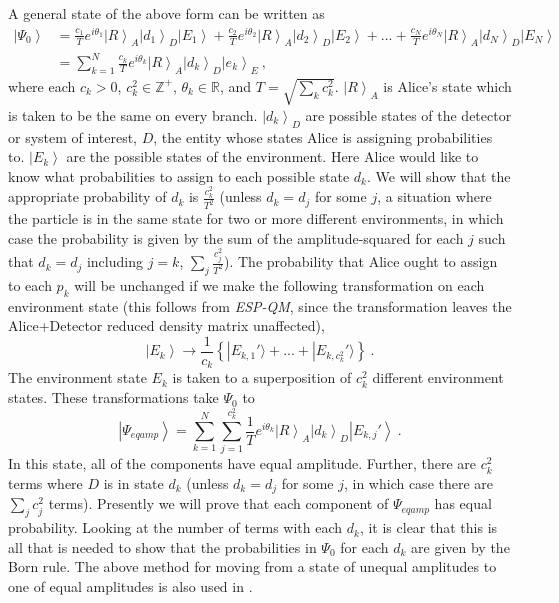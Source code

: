 \documentclass[onecolumn,secnumarabic,amsmath,amssymb,balancelastpage,nofootinbib]{article}
\newcommand{\ket}[1]{\ensuremath{\left|#1\right\rangle}}
\begin{document}
A general state of the above form can be written as
\begin{align}
\ket{\Psi_0}&= \frac{c_1}{T}e^{i\theta_1}\ket{R}_A\ket{d_1}_D\ket{E_1}+\frac{c_2}{T}e^{i\theta_2}\ket{R}_A\ket{d_2}_D\ket{E_2}+...+\frac{c_N}{T}e^{i\theta_N}\ket{R}_A\ket{d_N}_D\ket{E_N}
\nonumber
\\
&= \sum_{k=1}^N{\frac{c_k}{T}e^{i\theta_k}\ket{R}_A\ket{d_k}_D\ket{e_k}_E}\ ,
\label{}
\end{align}
where each $c_k>0$, $c_k^2\in\mathbb{Z}^+$, $\theta_k\in\mathbb{R}$, and $T=\sqrt{\sum_k{c_k^2}}$.  $\ket{R}_A$ is Alice's state which is taken to be the same on every branch.  $\ket{d_k}_D$ are possible states of the detector or system of interest, $D$, the entity whose states Alice is assigning probabilities to.  $\ket{E_k}$ are the possible states of the environment.  Here Alice would like to know what probabilities to assign to each possible state $d_k$.  We will show that the appropriate probability of $d_k$ is $\frac{c_k^2}{T^2}$ (unless $d_k=d_j$ for some $j$, a situation where the particle is in the same state for two or more different environments, in which case the probability is given by the sum of the amplitude-squared for each $j$ such that $d_k=d_j$ including $j=k$, $\sum_j\frac{c_j^2}{T^2}$).  The probability that Alice ought to assign to each $p_k$ will be unchanged if we make the following transformation on each environment state (this follows from \emph{ESP-QM}, since the transformation leaves the Alice+Detector reduced density matrix unaffected),
\begin{equation}
\ket{E_k}\longrightarrow\frac{1}{c_k}\left\{|E_{k,1}'\rangle+...+|E_{k,c_k^2}'\rangle\right\}\ .
\label{}
\end{equation}
The environment state $E_k$ is taken to a superposition of $c_k^2$ different environment states.
These transformations take $\Psi_0$ to
\begin{equation}
\ket{\Psi_{eqamp}}=\sum_{k=1}^N{\sum_{j=1}^{c_k^2}\frac{1}{T}e^{i\theta_k}\ket{R}_A\ket{d_k}_D\ket{E_{k,j}'}}\ .
\label{eqamp}
\end{equation}
In this state, all of the components have equal amplitude.  Further, there are $c_k^2$ terms where $D$ is in state $d_k$ (unless $d_k=d_j$ for some $j$, in which case there are $\sum_j c_j^2$ terms).  Presently we will prove that each component of $\Psi_{eqamp}$ has equal probability.  Looking at the number of terms with each $d_k$, it is clear that this is all that is needed to show that the probabilities in $\Psi_0$ for each $d_k$ are given by the Born rule.  The above method for moving from a state of unequal amplitudes to one of equal amplitudes is also used in \citep[\textsection II.D]{zurek2005}.
\end{document}
